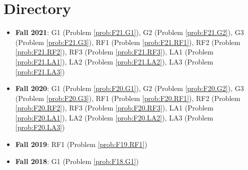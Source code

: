 \documentclass{article}
\theoremstyle{definition}
\begin{document}
\tableofcontents

\section{Directory}

\begin{itemize}
\item \textbf{Fall 2021}: 	G1 (Problem \ref{prob:F21.G1}), 
							G2 (Problem \ref{prob:F21.G2}), 
							G3 (Problem \ref{prob:F21.G3}),
							RF1 (Problem \ref{prob:F21.RF1}),
							RF2 (Problem \ref{prob:F21.RF2}),
							RF3 (Problem \ref{prob:F21.RF3}),
							LA1 (Problem \ref{prob:F21.LA1}),
							LA2 (Problem \ref{prob:F21.LA2}),
							LA3 (Problem \ref{prob:F21.LA3})
\item \textbf{Fall 2020}:  	G1 (Problem \ref{prob:F20.G1}), 
							G2 (Problem \ref{prob:F20.G2}), 
							G3 (Problem \ref{prob:F20.G3}),
							RF1 (Problem \ref{prob:F20.RF1}),
							RF2 (Problem \ref{prob:F20.RF2}),
							RF3 (Problem \ref{prob:F20.RF3}),
							LA1 (Problem \ref{prob:F20.LA1}),
							LA2 (Problem \ref{prob:F20.LA2}),
							LA3 (Problem \ref{prob:F20.LA3})
\item \textbf{Fall 2019}: RF1 (Problem \ref{prob:F19.RF1})
\item \textbf{Fall 2018}: G1 (Problem \ref{prob:F18.G1})

\end{itemize}














\end{document}
